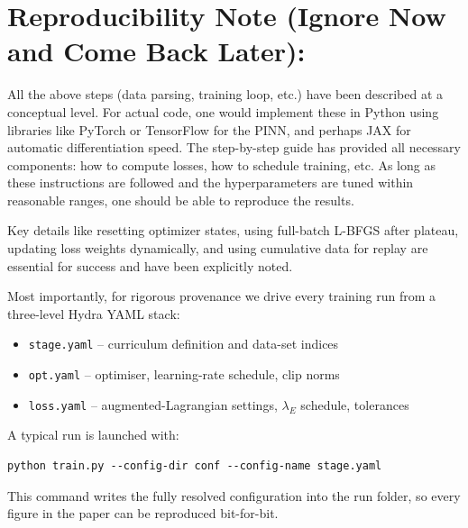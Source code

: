 \section{Reproducibility Note (Ignore Now and Come Back Later):} All the above steps (data parsing, training loop, etc.) have been described at a conceptual level.  
For actual code, one would implement these in Python using libraries like PyTorch or TensorFlow for the PINN, 
and perhaps JAX for automatic differentiation speed.  The step-by-step guide has provided all necessary components: 
how to compute losses, how to schedule training, etc. As long as these instructions are followed and the hyperparameters are tuned 
within reasonable ranges, one should be able to reproduce the results.  \begin{sloppypar}
Key details like resetting optimizer states, using full-batch L-BFGS after plateau, 
updating loss weights dynamically, and using cumulative data for replay are essential 
for success and have been explicitly noted.
\end{sloppypar} 

\begin{sloppypar}
Most importantly, for rigorous provenance we drive every training run from a
three-level Hydra YAML stack:
\end{sloppypar}

\begin{itemize}
    \item \texttt{stage.yaml} – curriculum definition and data-set indices\\
    \item \texttt{opt.yaml} – optimiser, learning-rate schedule, clip norms\\
    \item \texttt{loss.yaml} – augmented-Lagrangian settings, $\lambda_E$ schedule, 
    tolerances
\end{itemize}

A typical run is launched with:

\begin{verbatim}
python train.py --config-dir conf --config-name stage.yaml
\end{verbatim}

This command writes the fully resolved configuration into the run folder, so every figure in the paper can be reproduced bit-for-bit.

